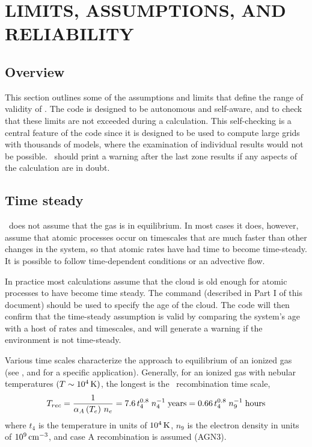 \chapter{LIMITS, ASSUMPTIONS, AND RELIABILITY}

\section{Overview}

This section outlines some of the assumptions and limits that define
the range of validity of \Cloudy.
The code is designed to be autonomous
and self-aware, and to check that these limits are not exceeded during a
calculation.
This self-checking is a central feature of the code since
it is designed to be used to compute large grids with thousands of models,
where the examination of individual results would not be possible.
\Cloudy\ should print a warning after the last zone results
if any aspects of the calculation are in doubt.

\section{Time steady}

\Cloudy\ does not assume that the gas is in equilibrium.
In most cases
it does, however, assume that atomic processes occur on timescales that
are much faster than other changes in the system,
so that atomic rates have
had time to become time-steady.
It is possible to follow time-dependent
conditions or an advective flow.

In practice most calculations assume that the cloud is old enough
for
atomic processes to have become time steady.
The  command (described
in Part I of this document) should be used to
specify the age of the cloud.
The code will then confirm that the time-steady
assumption is valid by
comparing the system's age with a host of rates and timescales,
and will
generate a warning if the environment is not time-steady.

Various time scales characterize the approach to equilibrium of an ionized
gas (see \citealp{Spitzer1962}, and \citealp{Ferland1979}
for a specific application).
Generally, for an ionized gas with nebular temperatures
$(T \sim 10^4 {\rm\thinspace K})$, the longest
is the \hplus\ recombination time scale,
\begin{equation}
T_{rec}  = {1 \over {\alpha _A \left( {T_e } \right)\,n_e }} = 7.6\,t_4^{0.8}
\;n_4^{ - 1} \;{\mathrm{years}} = 0.66\,t_4^{0.8} \;n_9^{ - 1} \;{\mathrm{hours}}%
\end{equation}
where $t_4$ is the temperature in units of $10^4 {\rm\thinspace K}$,
$n_9$ is the electron density in units of $10^9 {\rm\thinspace cm^{-3}}$,
and case A recombination is assumed (AGN3).

